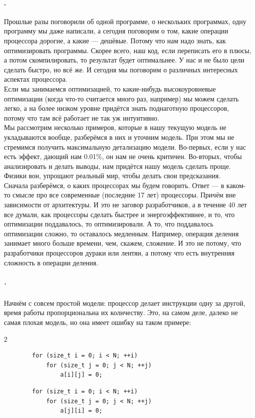 \documentclass{article}
\begin{document}
    \paragraph{.}
    Прошлые разы поговорили об одной программе, о нескольких программах, одну программу мы даже написали, а сегодня поговорим о том, какие операции процессора дорогие, а какие --- дешёвые. Потому что нам надо знать, как оптимизировать программы. Скорее всего, наш код, если переписать его в плюсы, а потом скомпилировать, то результат будет оптимальнее. У нас и не было цели сделать быстро, но всё же. И сегодня мы поговорим о различных интересных аспектах процессора.\\
    Если мы занимаемся оптимизацией, то какие-нибудь высокоуровневые оптимизации (когда что-то считается много раз, например) мы можем сделать легко, а на более низком уровне придётся знать поднаготную процессоров, потому что там всё работает не так уж интуитивно.\\
    Мы рассмотрим несколько примеров, которые в нашу текущую модель не укладываются вообще, разберёмся в них и уточним модель. При этом мы не стремимся получить максимальную детализацию модели. Во-первых, если у нас есть эффект, дающий нам 0.01\%, он нам не очень критичен. Во-вторых, чтобы анализировать и делать выводы, нам придётся нашу модель сделать проще. Физики вон, упрощают реальный мир, чтобы делать свои предсказания.\\
    Сначала разберёмся, о каких процессорах мы будем говорить. Ответ --- в каком-то смысле про все современные (последние 17 лет) процессоры. Причём вне зависимости от архитектуры. И это не заговор разработчиков, а в течение 40 лет все думали, как процессоры сделать быстрее и энергоэффективнее, и то, что оптимизации поддавалось, то оптимизировали. А то, что поддавалось оптимизации сложно, то оставалось медленным. Например, операция деления занимает много больше времени, чем, скажем, сложение. И это не потому, что разработчики процессоров дураки или лентяи, а потому что есть внутренняя сложность в операции деления.
    \subparagraph{.}
    Начнём с совсем простой модели: процессор делает инструкции одну за другой, время работы пропорциональна их количеству. Это, на самом деле, далеко не самая плохая модель, но она имеет ошибку на таком примере:
    \begin{multicols}{2}
    \begin{verbatim}
        for (size_t i = 0; i < N; ++i)
            for (size_t j = 0; j < N; ++j)
                a[i][j] = 0;
    \end{verbatim}
    \columnbreak
    \begin{verbatim}
        for (size_t i = 0; i < N; ++i)
            for (size_t j = 0; j < N; ++j)
                a[j][i] = 0;
    \end{verbatim}
    \end{multicols}\noindent
\end{document}
